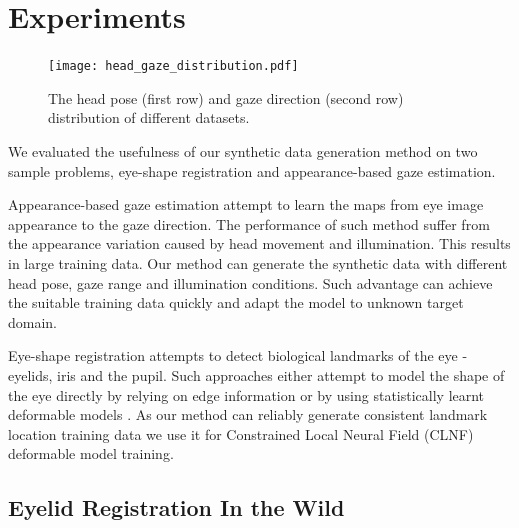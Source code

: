 
\section{Experiments}


\begin{figure}
    \centering
    \texttt{[image: head\_gaze\_distribution.pdf]}
    \caption{The head pose (first row) and gaze direction (second row) distribution of different datasets.}
    \label{fig:head_gaze_distribution}
\end{figure}


% 

We evaluated the usefulness of our synthetic data generation method on two sample problems, eye-shape registration and appearance-based gaze estimation.


Appearance-based gaze estimation attempt to learn the maps from eye image appearance to the gaze direction. The performance of such method suffer from the appearance variation caused by head movement and illumination. This results in large training data. Our method can generate the synthetic data with different head pose, gaze range and illumination conditions. Such advantage can achieve the suitable training data quickly and adapt the model to unknown target domain.

Eye-shape registration attempts to detect biological landmarks of the eye - eyelids, iris and the pupil. 
Such approaches either attempt to model the shape of the eye directly by relying on edge information \cite{wood2014eyetab, swirski2012robust} or by using statistically learnt deformable models \cite{alabort2014statistically}. 
As our method can reliably generate consistent landmark location training data we use it for Constrained Local Neural Field (CLNF) \cite{baltrusaitis2013constrained} deformable model training.

\subsection{Eyelid Registration In the Wild}

